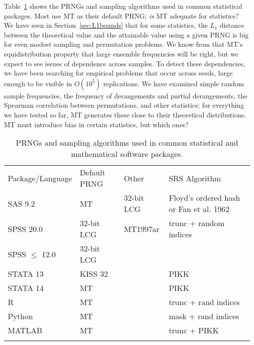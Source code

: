 \documentclass[graybox]{svmult}
\begin{document}
Table~\ref{tab:software} shows the PRNGs and sampling algorithms used in common statistical packages.
Most use MT as their default PRNG; \emph{is} MT adequate for statistics?
We have seen in Section~\ref{sec:L1bounds} that for some statistics, the $L_1$ distance between the theoretical value and the attainable value using a given PRNG
 is big for even modest sampling and permutation problems.
We know from that MT's equidistribution property that large ensemble frequencies will be right, but we expect to see issues of dependence across samples.
To detect these dependencies, we have been searching for empirical problems that occur across seeds, large enough to be visible in $O(10^5)$ replications.
We have examined simple random sample frequencies, the frequency of derangements and partial derangements, the Spearman correlation between permutations, 
and other statistics;
for everything we have tested so far, MT generates these close to their theoretical distributions.
MT must introduce bias in certain statistics, but which ones?

\begin{table}
\caption{PRNGs and sampling algorithms used in common statistical and mathematical software packages.}
\label{tab:software}      
\begin{tabular}[h]{p{2.5cm}p{2.4cm}p{2.5cm}p{4cm}}
\hline\noalign{\smallskip}
Package/Language & Default PRNG & Other & SRS Algorithm  \\
\noalign{\smallskip}\svhline\noalign{\smallskip}
SAS 9.2              & MT         	& 32-bit LCG & Floyd's ordered hash or Fan et al. 1962 \\
SPSS 20.0          & 32-bit LCG  & MT1997ar  & trunc + random indices \\
SPSS $\le$ 12.0 & 32-bit LCG  &         &                \\
STATA 13            & KISS 32      &         & PIKK           \\
STATA 14            & MT              &         & PIKK           \\
R                         & MT              &         & trunc + rand indices \\
Python                 & MT             &         & mask + rand indices  \\
MATLAB              & MT             &         & trunc + PIKK         \\
\noalign{\smallskip}\hline\noalign{\smallskip}
\end{tabular}
\end{table}
\end{document}
